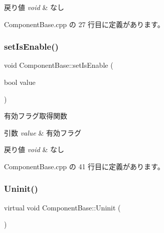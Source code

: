 \begin{DoxyRetVals}{戻り値}
{\em void} & なし \\
\hline
\end{DoxyRetVals}


 Component\+Base.\+cpp の 27 行目に定義があります。

\mbox{\label{class_component_base_aded407119b125a269d272647fc4c4639}} 
\subsubsection{\texorpdfstring{set\+Is\+Enable()}{setIsEnable()}}
{\footnotesize\ttfamily void Component\+Base\+::set\+Is\+Enable (\begin{DoxyParamCaption}\item[{bool}]{value }\end{DoxyParamCaption})}



有効フラグ取得関数 


\begin{DoxyParams}{引数}
{\em value} & 有効フラグ \\
\hline
\end{DoxyParams}

\begin{DoxyRetVals}{戻り値}
{\em void} & なし \\
\hline
\end{DoxyRetVals}


 Component\+Base.\+cpp の 41 行目に定義があります。

\mbox{\label{class_component_base_a9f42beaf0383d6f629819579cab4de57}} 
\subsubsection{\texorpdfstring{Uninit()}{Uninit()}}
{\footnotesize\ttfamily virtual void Component\+Base\+::\+Uninit (\begin{DoxyParamCaption}{ }\end{DoxyParamCaption})\hspace{0.3cm}{\ttfamily [pure virtual]}}



